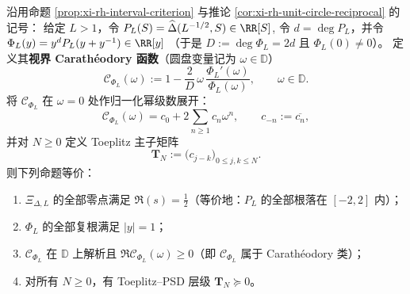 \begin{theorem}\label{thm:xi-slice-horizon-carath-toeplitz}
沿用命题 \ref{prop:xi-rh-interval-criterion} 与推论 \ref{cor:xi-rh-unit-circle-reciprocal} 的记号：
给定 \(L>1\)，令
\(
P_L(S)=\widehat\Delta(L^{-1/2},S)\in\RR[S]
\),
令 \(d=\deg P_L\)，并令
\(
\Phi_L(y)=y^{d}P_L(y+y^{-1})\in\RR[y]
\)
（于是 \(D:=\deg\Phi_L=2d\) 且 \(\Phi_L(0)\neq 0\)）。
定义其\textbf{视界 Carath\'eodory 函数}（圆盘变量记为 \(\omega\in\mathbb{D}\)）
\begin{equation}\label{eq:xi-slice-carath-def}
\boxed{\;
\mathscr{C}_{\Phi_L}(\omega)
:=
1-\frac{2}{D}\,\omega\,\frac{\Phi_L'(\omega)}{\Phi_L(\omega)},
\qquad \omega\in\mathbb{D}.
\;}
\end{equation}
将 \(\mathscr{C}_{\Phi_L}\) 在 \(\omega=0\) 处作归一化幂级数展开：
\[
\mathscr{C}_{\Phi_L}(\omega)=c_0+2\sum_{n\ge 1}c_n\omega^n,
\qquad c_{-n}:=\overline{c_n},
\]
并对 \(N\ge 0\) 定义 Toeplitz 主子矩阵
\[
\mathbf{T}_N:=\bigl(c_{j-k}\bigr)_{0\le j,k\le N}.
\]
则下列命题等价：
\begin{enumerate}
  \item \(\Xi_{\Delta,L}\) 的全部零点满足 \(\Re(s)=\tfrac12\)（等价地：\(P_L\) 的全部根落在 \([-2,2]\) 内）；
  \item \(\Phi_L\) 的全部复根满足 \(|y|=1\)；
  \item \(\mathscr{C}_{\Phi_L}\) 在 \(\mathbb{D}\) 上解析且 \(\Re \mathscr{C}_{\Phi_L}(\omega)\ge 0\)（即 \(\mathscr{C}_{\Phi_L}\) 属于 Carath\'eodory 类）；
  \item 对所有 \(N\ge 0\)，有 Toeplitz--PSD 层级 \(\mathbf{T}_N\succeq 0\)。
\end{enumerate}
\end{theorem}
